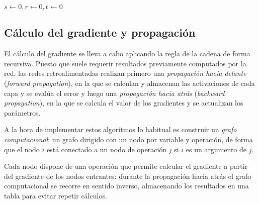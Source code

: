 \begin{algorithm}[tb]
    \SetAlgoLined
    \mydatal{$\rho_1, \rho_2 \in [0, 1)$, tasa de decaimiento exponencial}
    $s \gets 0, r \gets 0, t \gets 0$\;
    \Return{$\theta$}
    \caption{$\texttt{Adam}(\theta, L; \Lambda)$\cite{kingma2014adam}}
    \label{algo:adam}
\end{algorithm}

\subsection{Cálculo del gradiente y propagación}
El cálculo del gradiente se lleva a cabo aplicando la regla de la cadena de forma recursiva. Puesto que suele requerir resultados previamente computados por la red, las redes retroalimentadas realizan primero una \textit{propagación hacia delante} (\textit{forward propagation}), en la que se calculan y almacenan las activaciones de cada capa y se evalúa el error y luego una \textit{propagación hacia atrás} (\textit{backward propagation}), en la que se calcula el valor de los gradientes y se actualizan los parámetros. 

A la hora de implementar estos algoritmos lo habitual es construir un \textit{grafo computacional}: un grafo dirigido con un nodo por variable y operación, de forma que el nodo \( i \) está conectado a un nodo de operación \( j \) si \( i \) es un argumento de \( j \). 

Cada nodo dispone de una operación que permite calcular el gradiente a partir del gradiente de los nodos entrantes: durante la propagación hacia atrás el grafo computacional se recorre en sentido inverso, almacenando los resultados en una tabla para evitar repetir cálculos.

